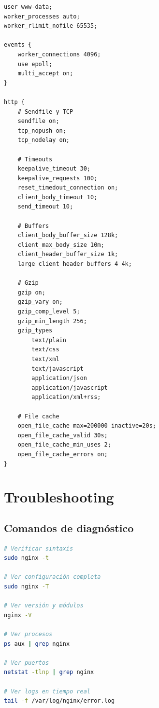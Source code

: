 \documentclass[11pt,a4paper]{article}
\begin{document}
\begin{lstlisting}[caption=Optimización de rendimiento]
user www-data;
worker_processes auto;
worker_rlimit_nofile 65535;

events {
    worker_connections 4096;
    use epoll;
    multi_accept on;
}

http {
    # Sendfile y TCP
    sendfile on;
    tcp_nopush on;
    tcp_nodelay on;
    
    # Timeouts
    keepalive_timeout 30;
    keepalive_requests 100;
    reset_timedout_connection on;
    client_body_timeout 10;
    send_timeout 10;
    
    # Buffers
    client_body_buffer_size 128k;
    client_max_body_size 10m;
    client_header_buffer_size 1k;
    large_client_header_buffers 4 4k;
    
    # Gzip
    gzip on;
    gzip_vary on;
    gzip_comp_level 5;
    gzip_min_length 256;
    gzip_types
        text/plain
        text/css
        text/xml
        text/javascript
        application/json
        application/javascript
        application/xml+rss;
    
    # File cache
    open_file_cache max=200000 inactive=20s;
    open_file_cache_valid 30s;
    open_file_cache_min_uses 2;
    open_file_cache_errors on;
}
\end{lstlisting}

\section{Troubleshooting}

\subsection{Comandos de diagnóstico}

\begin{lstlisting}[language=bash]
# Verificar sintaxis
sudo nginx -t

# Ver configuración completa
sudo nginx -T

# Ver versión y módulos
nginx -V

# Ver procesos
ps aux | grep nginx

# Ver puertos
netstat -tlnp | grep nginx

# Ver logs en tiempo real
tail -f /var/log/nginx/error.log
\end{lstlisting}
\end{document}
